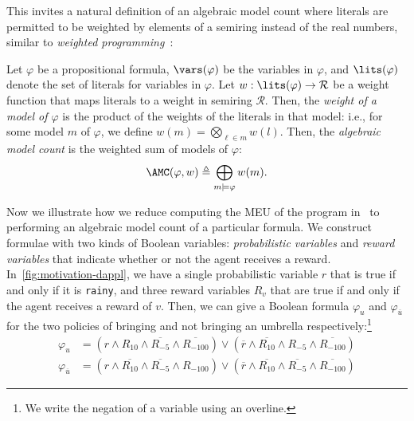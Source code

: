 This invites a natural definition of an algebraic model count where
literals are permitted to be weighted by elements of a semiring instead of the real numbers,
similar to \emph{weighted programming}~\citep{batz2022weighted}:
\begin{definition}
\label{def:amc}
  Let $\varphi$ be a propositional formula, $\vars(\varphi)$ be the variables in $\varphi$,
  and $\lits(\varphi)$ denote the set of literals for variables in $\varphi$.
  Let $w : \lits(\varphi) \rightarrow \mathcal R$ be a weight function that
  maps literals to a weight in semiring $\mathcal R$.
  Then, the \emph{weight of a model of $\varphi$} is the product of the weights
  of the literals in that model: i.e., for some model $m$ of $\varphi$,
  we define $w(m) = \bigotimes_{\ell \in m} w(l)$.
  Then, the \emph{algebraic model count} is the weighted sum of models of $\varphi$:
  \begin{align}\label{eq:amc}
    \AMC(\varphi, w) \triangleq \bigoplus_{m \models \varphi} w(m).
  \end{align}
\end{definition}

Now we illustrate how we reduce computing the MEU of the \dappl{}
program in~ to performing an algebraic
model count of a particular formula.
We
construct formulae with two kinds of Boolean variables: \emph{probabilistic variables}
and \emph{reward variables} that indicate
whether or not the agent receives a reward.
In~\cref{fig:motivation-dappl}, we have a single probabilistic variable $r$ that is true if and only if it is \texttt{rainy},
and three reward variables $R_v$ that are
true if and only if the agent receives a reward of $v$. Then, we can give a
Boolean formula $\varphi_{u}$ and $\varphi_{\overline{u}}$ for the two policies
of bringing and not bringing an umbrella respectively:\footnote{We write the
negation of a variable using an overline.}
\begin{align}
  \varphi_u &= (r \land R_{10} \land \overline{R_{-5}} \land \overline{R_{-100}}) \lor (\overline{r} \land \overline{R_{10}} \land {R_{-5}} \land \overline{R_{-100}}) \label{eq:formula-umbrella} \\
  \varphi_{\overline{u}} &= (r \land \overline{R_{10}} \land \overline{R_{-5}} \land {R_{-100}}) \lor (\overline{r} \land \overline{R_{10}} \land \overline{R_{-5}} \land \overline{R_{-100}})
  \label{eq:formula-no-umbrella}
\end{align}

